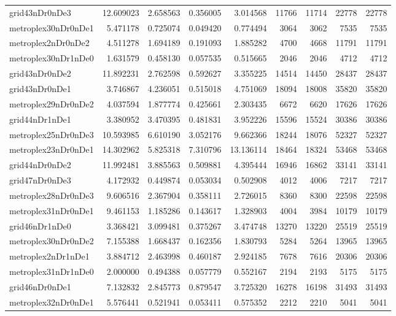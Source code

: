 \begin{longtable}{|l|r|r|r|r|r|r|r|r|}
grid43nDr0nDe3 & 12.609023 & 2.658563 & 0.356005 & 3.014568 & 11766 & 11714 & 22778 & 22778 \\
metroplex30nDr0nDe1 & 5.471178 & 0.725074 & 0.049420 & 0.774494 & 3064 & 3062 & 7535 & 7535 \\
metroplex2nDr0nDe2 & 4.511278 & 1.694189 & 0.191093 & 1.885282 & 4700 & 4668 & 11791 & 11791 \\
metroplex30nDr1nDe0 & 1.631579 & 0.458130 & 0.057535 & 0.515665 & 2046 & 2046 & 4712 & 4712 \\
grid43nDr0nDe2 & 11.892231 & 2.762598 & 0.592627 & 3.355225 & 14514 & 14450 & 28437 & 28437 \\
grid43nDr0nDe1 & 3.746867 & 4.236051 & 0.515018 & 4.751069 & 18094 & 18008 & 35820 & 35820 \\
metroplex29nDr0nDe2 & 4.037594 & 1.877774 & 0.425661 & 2.303435 & 6672 & 6620 & 17626 & 17626 \\
grid44nDr1nDe1 & 3.380952 & 3.470395 & 0.481831 & 3.952226 & 15596 & 15524 & 30386 & 30386 \\
metroplex25nDr0nDe3 & 10.593985 & 6.610190 & 3.052176 & 9.662366 & 18244 & 18076 & 52327 & 52327 \\
metroplex23nDr0nDe1 & 14.302962 & 5.825318 & 7.310796 & 13.136114 & 18464 & 18324 & 53468 & 53468 \\
grid44nDr0nDe2 & 11.992481 & 3.885563 & 0.509881 & 4.395444 & 16946 & 16862 & 33141 & 33141 \\
grid47nDr0nDe3 & 4.172932 & 0.449874 & 0.053034 & 0.502908 & 4012 & 4006 & 7217 & 7217 \\
metroplex28nDr0nDe3 & 9.606516 & 2.367904 & 0.358111 & 2.726015 & 8360 & 8300 & 22598 & 22598 \\
metroplex31nDr0nDe1 & 9.461153 & 1.185286 & 0.143617 & 1.328903 & 4004 & 3984 & 10179 & 10179 \\
grid46nDr1nDe0 & 3.368421 & 3.099481 & 0.375267 & 3.474748 & 13270 & 13220 & 25519 & 25519 \\
metroplex30nDr0nDe2 & 7.155388 & 1.668437 & 0.162356 & 1.830793 & 5284 & 5264 & 13965 & 13965 \\
metroplex2nDr1nDe1 & 3.884712 & 2.463998 & 0.460187 & 2.924185 & 7678 & 7616 & 20306 & 20306 \\
metroplex31nDr1nDe0 & 2.000000 & 0.494388 & 0.057779 & 0.552167 & 2194 & 2193 & 5175 & 5175 \\
grid46nDr0nDe1 & 7.132832 & 2.845773 & 0.879547 & 3.725320 & 16278 & 16198 & 31493 & 31493 \\
metroplex32nDr0nDe1 & 5.576441 & 0.521941 & 0.053411 & 0.575352 & 2212 & 2210 & 5041 & 5041 \\

\end{longtable}
